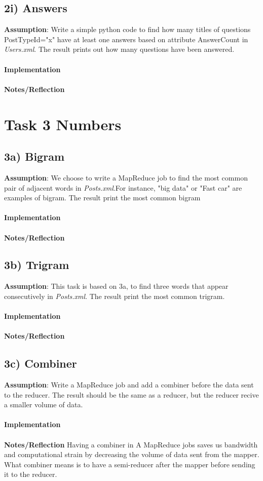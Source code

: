 \documentclass[fleqn,10pt]{wlscirep}
\begin{document}
\subsection*{2i) Answers }
\textbf{Assumption}: Write a simple python code to find how many titles of questions PostTypeId="x" have at least one answers based on attribute AnswerCount in \textit{Users.xml}. The result prints out how many questions have been answered.  \\ \\
\textbf{Implementation}  \\ \\
\textbf{Notes/Reflection}

\section*{Task 3 Numbers}

\subsection*{3a) Bigram }
\textbf{Assumption}: We choose to write a MapReduce job to find the most common pair of adjacent words in \textit{Posts.xml}.For instance, "big data" or "Fast car" are examples of bigram. The result print the most common bigram   \\\\
\textbf{Implementation}  \\ \\
\textbf{Notes/Reflection}

\subsection*{3b) Trigram }
\textbf{Assumption}: This task is based on 3a, to find three words that appear consecutively in \textit{Posts.xml}. The result print the most common trigram.  \\ \\
\textbf{Implementation}  \\ \\
\textbf{Notes/Reflection}

\subsection*{3c) Combiner }
\textbf{Assumption}: Write a MapReduce job and add a combiner before  the data sent to the reducer. The result should be the same as a reducer, but the reducer recive a smaller volume of data.  \\ \\
\textbf{Implementation}  \\ \\
\textbf{Notes/Reflection} Having a combiner in A MapReduce jobs saves us bandwidth and computational strain by decreasing the volume of data sent from the mapper.  What combiner means is to have a semi-reducer after the mapper before sending it to the reducer. 
\end{document}
